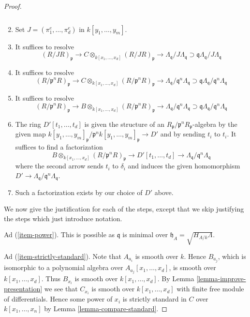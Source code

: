 \begin{proof}
\begin{enumerate}
$$$$
\item
\label{item-fourth-resolve}
Set $J = (\pi_1^e, \ldots, \pi_d^e)$ in $k[y_1, \ldots, y_m]$.
\item
\label{item-fifth-resolve}
It suffices to resolve
$$
(R/JR)_\mathfrak p \to
C \otimes_{k[x_1, \ldots, x_d]} (R/JR)_\mathfrak p \to
\Lambda_\mathfrak q/J\Lambda_\mathfrak q
\supset
\mathfrak q\Lambda_\mathfrak q/J\Lambda_\mathfrak q
$$
\item
\label{item-sixth-resolve}
It suffices to resolve
$$
(R/\mathfrak p^nR)_\mathfrak p \to
C \otimes_{k[x_1, \ldots, x_d]} (R/\mathfrak p^nR)_\mathfrak p \to
\Lambda_\mathfrak q/\mathfrak q^n\Lambda_\mathfrak q
\supset
\mathfrak q\Lambda_\mathfrak q/\mathfrak q^n\Lambda_\mathfrak q
$$
\item
\label{item-seventh-resolve}
It suffices to resolve
$$
(R/\mathfrak p^nR)_\mathfrak p \to
B \otimes_{k[x_1, \ldots, x_d]} (R/\mathfrak p^nR)_\mathfrak p \to
\Lambda_\mathfrak q/\mathfrak q^n\Lambda_\mathfrak q
\supset
\mathfrak q\Lambda_\mathfrak q/\mathfrak q^n\Lambda_\mathfrak q
$$
\item
\label{item-eighth-resolve}
The ring $D'[t_1, \ldots, t_d]$ is given the structure of an
$R_\mathfrak p/\mathfrak p^nR_\mathfrak p$-algebra by the given map
$k[y_1, \ldots, y_m]_\mathfrak p/\mathfrak p^n k[y_1, \ldots, y_m]_\mathfrak p
\to D'$ and by sending $t_i$ to $t_i$. It suffices to find a factorization
$$
B \otimes_{k[x_1, \ldots, x_d]} (R/\mathfrak p^nR)_\mathfrak p
\to D'[t_1, \ldots, t_d] \to
\Lambda_\mathfrak q/\mathfrak q^n\Lambda_\mathfrak q
$$
where the second arrow sends $t_i$ to $\delta_i$ and induces the given
homomorphism $D' \to \Lambda_\mathfrak q/\mathfrak q^n\Lambda_\mathfrak q$.
\item
\label{item-done}
Such a factorization exists by our choice of $D'$ above.
\end{enumerate}
We now give the justification for each of the steps, except that we
skip justifying the steps which just introduce notation.

\medskip\noindent
Ad (\ref{item-power}). This is possible as $\mathfrak q$ is minimal
over $\mathfrak h_A = \sqrt{H_{A/k}\Lambda}$.

\medskip\noindent
Ad (\ref{item-strictly-standard}). Note that $A_{a_i}$ is smooth
over $k$. Hence $B_{a_j}$, which is isomorphic to a polynomial
algebra over $A_{a_j}[x_1, \ldots, x_d]$, is smooth over
$k[x_1, \ldots, x_d]$. Thus $B_{x_i}$ is smooth over $k[x_1, \ldots, x_d]$.
By Lemma \ref{lemma-improve-presentation}
we see that $C_{x_i}$ is smooth over $k[x_1, \ldots, x_d]$
with finite free module of differentials. Hence some power of
$x_i$ is strictly standard in $C$ over $k[x_1, \ldots, x_n]$
by Lemma \ref{lemma-compare-standard}.


\end{proof}
